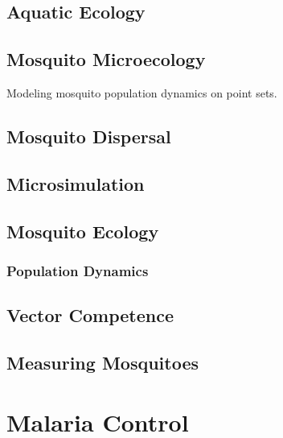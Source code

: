 \documentclass[
]{book}
\begin{document}
\hypertarget{aquatic-ecology}{%
\chapter{Aquatic Ecology}\label{aquatic-ecology}}

\hypertarget{mosquito-microecology}{%
\chapter{Mosquito Microecology}\label{mosquito-microecology}}

Modeling mosquito population dynamics on point sets.

\hypertarget{mosquito-dispersal}{%
\chapter{Mosquito Dispersal}\label{mosquito-dispersal}}

\hypertarget{microsimulation}{%
\chapter{Microsimulation}\label{microsimulation}}

\hypertarget{mosquito-ecology-1}{%
\chapter{Mosquito Ecology}\label{mosquito-ecology-1}}

\hypertarget{population-dynamics}{%
\section{Population Dynamics}\label{population-dynamics}}

\hypertarget{vector-competence}{%
\chapter{Vector Competence}\label{vector-competence}}

\hypertarget{measuring-mosquitoes}{%
\chapter{Measuring Mosquitoes}\label{measuring-mosquitoes}}

\hypertarget{part-malaria-control}{%
\part{Malaria Control}\label{part-malaria-control}}
\end{document}
